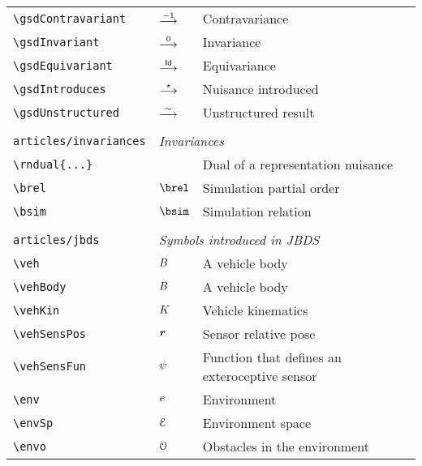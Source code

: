 \begin{longtable}{lll}
 \hline
{\color[rgb]{0.5,0.5,0.5}\texttt{\textbackslash gsdContravariant}} & $\stackrel{-1}{\longrightarrow}$ &  Contravariance\\ 
 {\color[rgb]{0.5,0.5,0.5}\texttt{\textbackslash gsdInvariant}} & $\stackrel{0}{\longrightarrow}$ &  Invariance\\ 
 {\color[rgb]{0.5,0.5,0.5}\texttt{\textbackslash gsdEquivariant}} & $\stackrel{\mathsf{Id}}{\longrightarrow}$ &  Equivariance\\ 
 {\color[rgb]{0.5,0.5,0.5}\texttt{\textbackslash gsdIntroduces}} & $\stackrel{\star}{\longrightarrow}$ &  Nuisance introduced\\ 
 {\color[rgb]{0.5,0.5,0.5}\texttt{\textbackslash gsdUnstructured}} & $\stackrel{\sim}{\longrightarrow}$ &  Unstructured result\\ 
  &  & \\ 
 {\color[rgb]{0.5,0.5,0.5}\texttt{articles/invariances}} & \multicolumn{2}{l}{\emph{Invariances}}\\ 
 \hline
{\color[rgb]{0.5,0.5,0.5}\texttt{\textbackslash rndual\{...\}}} &  &  Dual of a representation nuisance\\ 
 {\color[rgb]{0.5,0.5,0.5}\texttt{\textbackslash brel}} & $\brel$ &  Simulation partial order\\ 
 {\color[rgb]{0.5,0.5,0.5}\texttt{\textbackslash bsim}} & $\bsim$ &  Simulation relation\\ 
  &  & \\ 
 {\color[rgb]{0.5,0.5,0.5}\texttt{articles/jbds}} & \multicolumn{2}{l}{\emph{Symbols introduced in JBDS}}\\ 
 \hline
{\color[rgb]{0.5,0.5,0.5}\texttt{\textbackslash veh}} & $B$ &  A vehicle body\\ 
 {\color[rgb]{0.5,0.5,0.5}\texttt{\textbackslash vehBody}} & $B$ &  A vehicle body\\ 
 {\color[rgb]{0.5,0.5,0.5}\texttt{\textbackslash vehKin}} & $K$ &  Vehicle kinematics \\ 
 {\color[rgb]{0.5,0.5,0.5}\texttt{\textbackslash vehSensPos}} & $\boldsymbol{r}$ &  Sensor relative pose\\ 
 {\color[rgb]{0.5,0.5,0.5}\texttt{\textbackslash vehSensFun}} & $\psi$ &  Function that defines an exteroceptive sensor\\ 
 {\color[rgb]{0.5,0.5,0.5}\texttt{\textbackslash env}} & $e$ &  Environment\\ 
 {\color[rgb]{0.5,0.5,0.5}\texttt{\textbackslash envSp}} & $\mathcal{E}$ &  Environment space\\ 
 {\color[rgb]{0.5,0.5,0.5}\texttt{\textbackslash envo}} & $\mathcal{O}$ &  Obstacles in the environment\\ 

\end{longtable}
